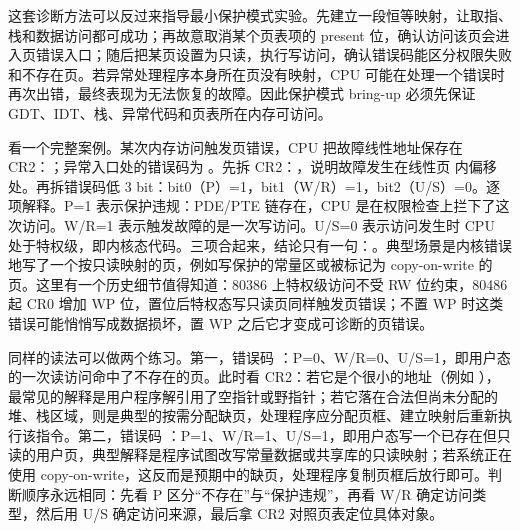 这套诊断方法可以反过来指导最小保护模式实验。先建立一段恒等映射，让取指、栈和数据访问都可成功；再故意取消某个页表项的 present 位，确认访问该页会进入页错误入口；随后把某页设置为只读，执行写访问，确认错误码能区分权限失败和不存在页。若异常处理程序本身所在页没有映射，CPU 可能在处理一个错误时再次出错，最终表现为无法恢复的故障。因此保护模式 bring-up 必须先保证 GDT、IDT、栈、异常代码和页表所在内存可访问。

看一个完整案例。某次内存访问触发页错误，CPU 把故障线性地址保存在 CR2：；异常入口处的错误码为 。先拆 CR2：，说明故障发生在线性页  内偏移  处。再拆错误码低 3 bit：bit0（P）=1，bit1（W/R）=1，bit2（U/S）=0。逐项解释。P=1 表示保护违规：PDE/PTE 链存在，CPU 是在权限检查上拦下了这次访问。W/R=1 表示触发故障的是一次写访问。U/S=0 表示访问发生时 CPU 处于特权级，即内核态代码。三项合起来，结论只有一句：。典型场景是内核错误地写了一个按只读映射的页，例如写保护的常量区或被标记为 copy-on-write 的页。这里有一个历史细节值得知道：80386 上特权级访问不受 RW 位约束，80486 起 CR0 增加 WP 位，置位后特权态写只读页同样触发页错误；不置 WP 时这类错误可能悄悄写成数据损坏，置 WP 之后它才变成可诊断的页错误。

同样的读法可以做两个练习。第一，错误码 ：P=0、W/R=0、U/S=1，即用户态的一次读访问命中了不存在的页。此时看 CR2：若它是个很小的地址（例如 ），最常见的解释是用户程序解引用了空指针或野指针；若它落在合法但尚未分配的堆、栈区域，则是典型的按需分配缺页，处理程序应分配页框、建立映射后重新执行该指令。第二，错误码 ：P=1、W/R=1、U/S=1，即用户态写一个已存在但只读的用户页，典型解释是程序试图改写常量数据或共享库的只读映射；若系统正在使用 copy-on-write，这反而是预期中的缺页，处理程序复制页框后放行即可。判断顺序永远相同：先看 P 区分“不存在”与“保护违规”，再看 W/R 确定访问类型，然后用 U/S 确定访问来源，最后拿 CR2 对照页表定位具体对象。


